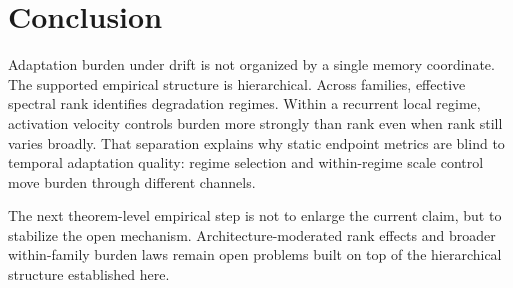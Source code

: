 \section{Conclusion}

Adaptation burden under drift is not organized by a single memory coordinate.
The supported empirical structure is hierarchical. Across families, effective
spectral rank identifies degradation regimes. Within a recurrent local regime,
activation velocity controls burden more strongly than rank even when rank still
varies broadly. That separation explains why static endpoint metrics are blind to
temporal adaptation quality: regime selection and within-regime scale control
move burden through different channels.

The next theorem-level empirical step is not to enlarge the current claim, but to
stabilize the open mechanism. Architecture-moderated rank effects and broader
within-family burden laws remain open problems built on top of the hierarchical
structure established here.
